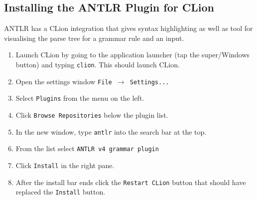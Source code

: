 \documentclass[../setup.tex]{subfiles}
\begin{document}
\subsection{Installing the ANTLR Plugin for CLion}
ANTLR has a CLion integration that gives syntax highlighting as well as tool for visualising the
parse tree for a grammar rule and an input.
\begin{enumerate}
  \item
    Launch CLion by going to the application launcher (tap the super/Windows button) and typing
    \lstinline{clion}. This should launch CLion.
  \item
    Open the settings window \texttt{File $\rightarrow$ Settings...}
  \item
    Select \texttt{Plugins} from the menu on the left.
  \item
    Click \texttt{Browse Repositories} below the plugin list.
  \item
    In the new window, type \texttt{antlr} into the search bar at the top.
  \item
    From the list select \lstinline{ANTLR v4 grammar plugin}
  \item
    Click \texttt{Install} in the right pane.
  \item
    After the install bar ends click the \texttt{Restart CLion} button that should have replaced
    the \texttt{Install} button.
\end{enumerate}
\end{document}
